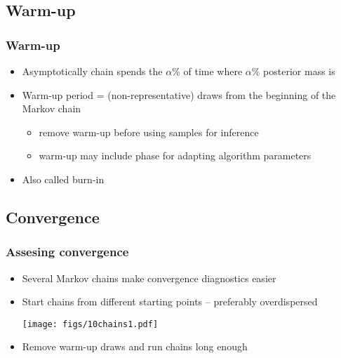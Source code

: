 \documentclass[10pt]{beamer}
\begin{document}
\subsection{Warm-up}
\frame{\subsectionpage}

\begin{frame}

\frametitle{Warm-up}

  \begin{itemize}
  \item Asymptotically chain spends the $\alpha$\% of time where
    $\alpha$\% posterior mass is
      \vspace{-.5\baselineskip}
    \item<3-> Warm-up period = (non-representative) draws from the beginning of the Markov chain
    \begin{itemize}
      \item remove warm-up before using samples for inference
      \item warm-up may include phase for adapting algorithm parameters
      \end{itemize}
    \item<4-> Also called {\color{uured} burn-in}
  \end{itemize}

\end{frame}

\subsection{Convergence}
\frame{\subsectionpage}

\begin{frame}

\frametitle{Assesing convergence}

  \vspace{-0.5\baselineskip}
  \begin{itemize}
  \item Several Markov chains make convergence diagnostics easier
  \pause
    \item Start chains from different starting points -- preferably overdispersed
      \begin{center}
  \vspace{-0.5\baselineskip}
      \texttt{[image: figs/10chains1.pdf]}
    \end{center}
  \vspace{-0.5\baselineskip}
    \item<2-> Remove warm-up draws and run chains long enough
  \end{itemize}

\end{frame}
\end{document}
